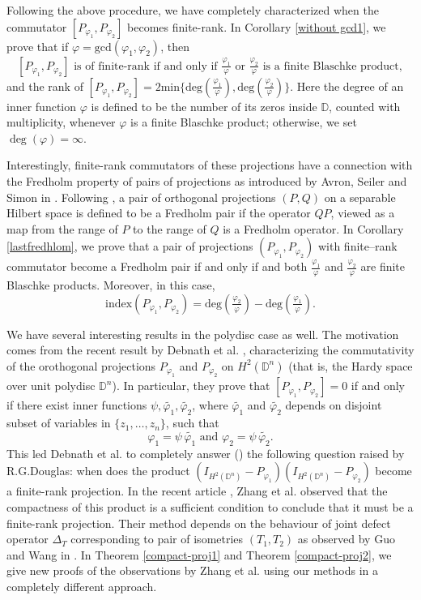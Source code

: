\documentclass[12pt, a4 paper]{amsart}
\newcommand{\D}{\mathbb{D}}
\theoremstyle{definition}
\theoremstyle{plain}
\theoremstyle{definition}
\numberwithin{equation}{section}
\let\phi=\varphi
\begin{document}
Following the above procedure, we have completely characterized when the commutator $[P_{\phi_1}, P_{\phi_2}]$ becomes finite-rank. In Corollary \ref{without gcd1}, we prove that if $\phi=\mbox{gcd}(\phi_1,\phi_2)$, then
\[
[P_{\phi_1}, P_{\phi_2}] \text{ is of finite-rank if and only if } \tfrac{\phi_1}{\phi} \text{ or } \tfrac{\phi_2}{\phi} \text{ is a finite Blaschke product},
\]
and the rank of $
 [P_{\phi_1}, P_{\phi_2}] =2 \text{min}\{\text{deg}(\tfrac{\phi_1}{\phi}), \text{deg}(\tfrac{\phi_2}{\phi})\}
$. Here the degree of an inner function $\phi$ is defined to be the number of its zeros inside $\D$, counted with multiplicity, whenever $\phi$ is a finite Blaschke product; otherwise, we set $\deg(\phi)=\infty$. 

Interestingly, finite-rank commutators of these projections have a connection with the Fredholm property of pairs of projections as introduced by Avron, Seiler and Simon in \cite{ASS}. Following \cite{ASS}, a pair of orthogonal projections $(P,Q)$ on a separable Hilbert space is defined to be a Fredholm pair if the operator $QP$, viewed as a map from the range of $P$ to the range of $Q$ is a Fredholm operator. In Corollary \ref{lastfredhlom}, we prove that a pair of projections $(P_{\phi_1}, P_{\phi_2})$ with finite--rank commutator become a Fredholm pair if and only if and both $\tfrac{\phi_1}{\phi}$ and $\tfrac{\phi_2}{\phi}$ are finite Blaschke products. Moreover, in this case,
\[
\mbox{index}(P_{\phi_1},P_{\phi_2})=\text{deg}(\tfrac{\phi_2}{\phi})-\text{deg}(\tfrac{\phi_1}{\phi}).
\]

We have several interesting results in the polydisc case as well. The motivation comes from the recent result by Debnath et al. \cite{DPS}, characterizing the commutativity of the orothogonal projections $P_{\phi_1}$ and $P_{\phi_2}$ on $H^2(\D^n)$ (that is, the Hardy space over unit polydisc $\D^n$). In particular, they prove that $[P_{\phi_1}, P_{\phi_2}] = 0$ if and only if there exist inner functions $\psi, \tilde{\phi_1}, \tilde{\phi_2}$, where $\tilde{\phi_1}$ and $\tilde{\phi_2}$ depends on disjoint subset of variables in $\{z_1, \ldots, z_n\}$, such that 
\[
\phi_1 = \psi \, \tilde{\phi_1} \text{ and } \phi_2 = \psi \, \tilde{\phi_2}.
\]
This led Debnath et al. to completely answer (\cite[Theorem 3.2]{DPS}) the following question raised by R.G.Douglas: when does the product $(I_{H^2(\D^n)} - P_{\phi_1})(I_{H^2(\D^n)} - P_{\phi_2})$ become a finite-rank projection. In the recent article \cite{ZTLYZ}, Zhang et al. observed that the compactness of this product is a sufficient condition to conclude that it must be a finite-rank projection. Their method depends on the behaviour of joint defect operator $\Delta_T$ corresponding to pair of isometries $(T_1, T_2)$ as observed by Guo and Wang in \cite{GW}. In Theorem \ref{compact-proj1} and Theorem \ref{compact-proj2}, we give new proofs of the observations by Zhang et al. using our methods in a completely different approach.
\end{document}
